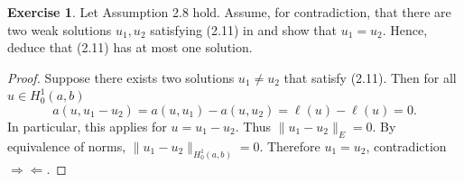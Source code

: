 \documentclass{amsart}
\theoremstyle{plain}
\theoremstyle{definition}
\newtheorem{exer}{Exercise}[section]
\begin{document}
\begin{exer}
    Let Assumption 2.8 hold. Assume, for contradiction, that there are two weak solutions $u_1,u_2$ satisfying (2.11) in \cite{lord2014introduction} and show that $u_1 = u_2$. Hence, deduce that (2.11) has at most one solution.
\end{exer}
\begin{proof}
Suppose there exists two solutions $u_1 \neq u_2$ that satisfy (2.11). Then for all $u\in H_0^1(a,b)$
$$a(u,u_1-u_2) = a(u,u_1)-a(u,u_2) = \ell(u)-\ell(u) = 0.$$ 
In particular, this applies for $u = u_1-u_2.$ Thus $\|u_1-u_2\|_{E} = 0.$ By equivalence of norms, $\|u_1-u_2\|_{H_0^1(a,b)} = 0.$ Therefore $u_1 = u_2$, contradiction $\Rightarrow\!\Leftarrow$. 
    
\end{proof}
\end{document}

